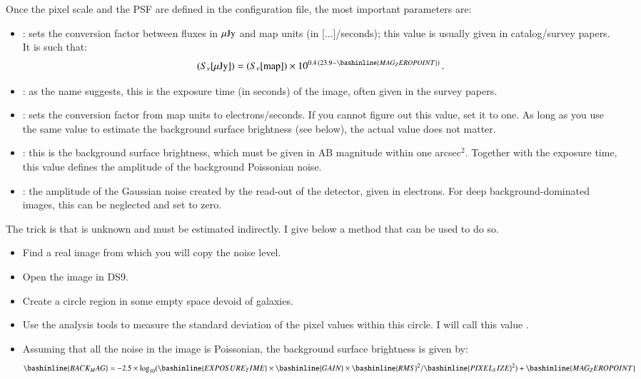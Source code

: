 Once the pixel scale and the PSF are defined in the \skymaker configuration file, the most important parameters are:
\begin{itemize}
\item {}: sets the conversion factor between fluxes in $\mu{\rm Jy}$ and map units (in [...]/seconds); this value is usually given in catalog/survey papers. It is such that:
\begin{equation}
    (S_\nu [\uJy]) = (S_\nu [{\rm map}]) \times 10^{0.4\,(23.9 - \bashinline{MAG_ZEROPOINT})}\,. \nonumber
\end{equation}
\item {}: as the name suggests, this is the exposure time (in seconds) of the image, often given in the survey papers.
\item {}: sets the conversion factor from map units to electrons/seconds. If you cannot figure out this value, set it to one. As long as you use the same value to estimate the background surface brightness (see below), the actual value does not matter.
\item {}: this is the background surface brightness, which must be given in AB magnitude within one arcsec$^2$. Together with the exposure time, this value defines the amplitude of the background Poissonian noise.
\item {}: the amplitude of the Gaussian noise created by the read-out of the detector, given in electrons. For deep background-dominated images, this can be neglected and set to zero.
\end{itemize}

The trick is that  is unknown and must be estimated indirectly. I give below a method that can be used to do so.
\begin{itemize}
\item Find a real image from which you will copy the noise level.
\item Open the image in DS9.
\item Create a circle region in some empty space devoid of galaxies.
\item Use the analysis tools to measure the standard deviation of the pixel values within this circle. I will call this value .
\item Assuming that all the noise in the image is Poissonian, the background surface brightness is given by:
\begin{equation}
    \bashinline{BACK_MAG} = -2.5\times\log_{10}(\bashinline{EXPOSURE_TIME}\times\bashinline{GAIN} \times \bashinline{RMS}^2/\bashinline{PIXEL_SIZE}^2) + \bashinline{MAG_ZEROPOINT} \nonumber
\end{equation}
\end{itemize}

